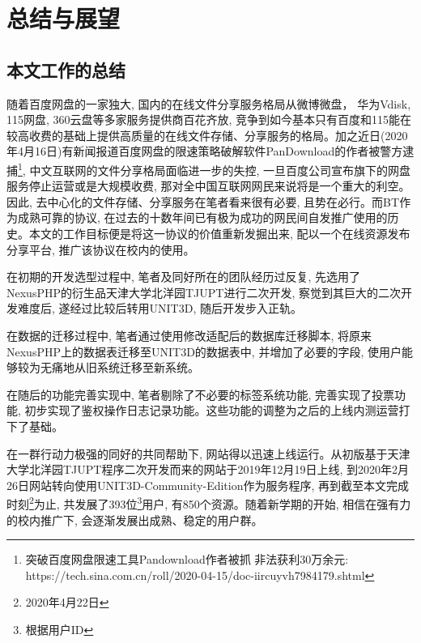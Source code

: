 
\chapter{总结与展望}


\section{本文工作的总结}

随着百度网盘的一家独大, 国内的在线文件分享服务格局从微博微盘， 华为Vdisk, 115网盘, 360云盘等多家服务提供商百花齐放, 竞争到如今基本只有百度和115能在较高收费的基础上提供高质量的在线文件存储、分享服务的格局。加之近日(2020年4月16日)有新闻报道百度网盘的限速策略破解软件PanDownload的作者被警方逮捕\footnote{突破百度网盘限速工具Pandownload作者被抓 非法获利30万余元: https://tech.sina.com.cn/roll/2020-04-15/doc-iircuyvh7984179.shtml}, 中文互联网的文件分享格局面临进一步的失控, 一旦百度公司宣布旗下的网盘服务停止运营或是大规模收费, 那对全中国互联网网民来说将是一个重大的利空。因此, 去中心化的文件存储、分享服务在笔者看来很有必要, 且势在必行。而BT作为成熟可靠的协议, 在过去的十数年间已有极为成功的网民间自发推广使用的历史。本文的工作目标便是将这一协议的价值重新发掘出来, 配以一个在线资源发布分享平台, 推广该协议在校内的使用。

在初期的开发选型过程中, 笔者及同好所在的团队经历过反复, 先选用了NexusPHP的衍生品天津大学北洋园TJUPT进行二次开发, 察觉到其巨大的二次开发难度后, 遂经过比较后转用UNIT3D, 随后开发步入正轨。

在数据的迁移过程中, 笔者通过使用修改适配后的数据库迁移脚本, 将原来NexusPHP上的数据表迁移至UNIT3D的数据表中, 并增加了必要的字段, 使用户能够较为无痛地从旧系统迁移至新系统。

在随后的功能完善实现中, 笔者剔除了不必要的标签系统功能, 完善实现了投票功能, 初步实现了鉴权操作日志记录功能。这些功能的调整为之后的上线内测运营打下了基础。

在一群行动力极强的同好的共同帮助下, 网站得以迅速上线运行。从初版基于天津大学北洋园TJUPT程序二次开发而来的网站于2019年12月19日上线, 到2020年2月26日网站转向使用UNIT3D-Community-Edition作为服务程序, 再到截至本文完成时刻\footnote{2020年4月22日}为止, 共发展了393位\footnote{根据用户ID}用户, 有850个资源。随着新学期的开始, 相信在强有力的校内推广下, 会逐渐发展出成熟、稳定的用户群。

